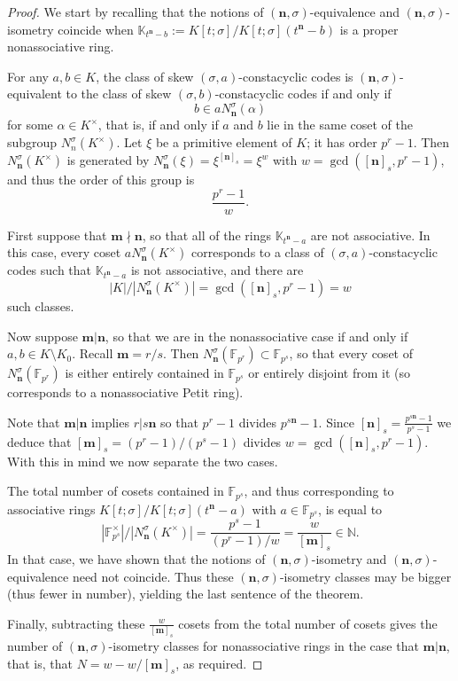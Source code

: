 \documentclass[11pt]{amsart}
\theoremstyle{plain}
\theoremstyle{definition}
\numberwithin{equation}{section}
\numberwithin{figure}{section}
\newcommand{\field}{K}
\newcommand{\Kone}[1]{K[t;\sigma]/K[t;\sigma](t^{\de}-#1)}
\newcommand{\Konenew}[1]{\mathbb{K}_{t^\de-#1}}
\newcommand{\os}{\mathbf{m}}  %
\newcommand{\de}{\mathbf{n}}  %
\begin{document}
\begin{proof}
We start by recalling that the notions of  $(\de,\sigma)$-equivalence and $(\de,\sigma)$-isometry coincide  when $\Konenew{b}:=\Kone{b}$ is a proper nonassociative ring.

    For any $a,b\in K$, the  class of skew $(\sigma,a)$-constacyclic codes is $(\de,\sigma)$-equivalent to the class of skew $(\sigma,b)$-constacyclic codes if and only if
    $$
    b \in aN_{\de}^\sigma(\alpha)
    $$
    for some $\alpha \in K^\times$, that is, if and only if $a$ and $b$ lie in the same coset of the subgroup $N_{n}^\sigma(K^\times)$.
    Let $\xi$ be a primitive element of $K$; it has order $p^r-1$.  Then $N_{\de}^\sigma(K^\times)$ is generated by $N_{\de}^\sigma(\xi) = \xi^{[\de]_s}=\xi^w$ with $w=\gcd([\de]_s,p^r-1)$, and thus the order of this group is
    $$
    \frac{p^r-1}{w}.
    $$

    First suppose that $\os\nmid \de$, so that all of the rings $\Konenew{a}$ are not associative.  In this case, every coset $aN_{\de}^\sigma(K^\times)$ corresponds to a class of $(\sigma,a)$-constacyclic codes such that $\Konenew{a}$ is not associative, and there are
    $$
    |K|/|N_{\de}^\sigma(K^\times)|= \gcd([\de]_s,p^r-1)=w
    $$
    such classes.

    Now suppose $\os|\de$, so that we are in the nonassociative case if and only if $a,b\in \field\setminus \field_0$. Recall $\os=r/s$.  Then $N_{\de}^\sigma(\mathbb{F}_{p^r})\subset \mathbb{F}_{p^s}$, so that every coset of $N_{\de}^\sigma(\mathbb{F}_{p^r})$ is either entirely contained in $\mathbb{F}_{p^s}$  or entirely disjoint from it (so corresponds to a nonassociative Petit ring).

Note that $\os|\de$ implies  $r|s\de$ so that  $p^r-1$ divides $p^{s\de}-1$.  Since $[\de]_s=\frac{p^{s\de}-1}{p^s-1}$ we deduce that $[\os]_s=(p^r-1)/(p^s-1)$ divides $w=\gcd([\de]_s,p^r-1)$.  With this in mind we now separate the two cases.

    The total number of cosets contained in $\mathbb{F}_{p^s}$, and thus corresponding to associative rings $\Kone{a}$ with $a\in \mathbb{F}_{p^s}$, is equal to
    $$
    |\mathbb{F}_{p^s}^\times|/|N_{\de}^\sigma(K^\times)| = \frac{p^s-1}{(p^r-1)/w} = \frac{w}{[\os]_s} \in \mathbb{N}.
    $$
In that case, we have shown that the notions of $(\de,\sigma)$-isometry and $(\de,\sigma)$-equivalence need not coincide.  Thus these $(\de,\sigma)$-isometry classes may be bigger (thus fewer in number), yielding the last sentence of the theorem.

Finally, subtracting these $\frac{w}{[\os]_s}$ cosets from the total number of cosets gives the number of $(\de,\sigma)$-isometry classes for nonassociative rings in the case that $\os|\de$, that is, that $N=w-w/[\os]_s$, as required.
\end{proof}
\end{document}
